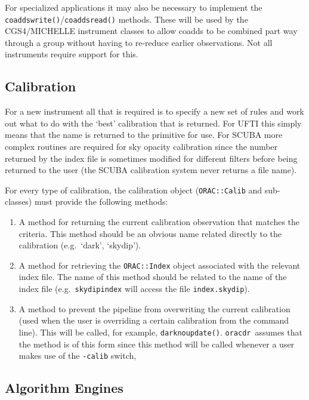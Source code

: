 \documentclass[twoside,11pt]{article}
\renewcommand{\_}{\texttt{\symbol{95}}}
\newcommand{\oracdr}{\texttt{oracdr}}
\begin{document}
For specialized applications it may also be necessary to implement 
the \texttt{coaddswrite()}/\texttt{coaddsread()} methods. These will
be used by the CGS4/MICHELLE instrument classes to allow coadds to be 
combined part way through a group without having to re-reduce earlier
observations. Not all instruments require support for this.

\subsection{Calibration}\label{calibration_add}

For a new instrument all that is required is to specify a new
set of rules and work out what to do with the `best' calibration that
is returned. For UFTI this simply means that the name is returned to
the primitive for use. For SCUBA more complex routines are required
for sky opacity calibration since the number returned by the index
file is sometimes modified for different filters before being returned 
to the user (the SCUBA calibration system never returns a file name).

For every type of calibration, the calibration object
(\texttt{ORAC::Calib} and sub-classes) must provide the following methods:
\begin{enumerate}
\item A method for returning the current calibration observation that
matches the criteria. This method should be an obvious name related
directly to the calibration (e.g.\ `dark', `skydip').
\item A method for retrieving the \texttt{ORAC::Index} object
associated with the relevant index file. The name of this method
should be related to the name of the index file (e.g.\
\texttt{skydipindex} will access the file \texttt{index.skydip}).
\item A method to prevent the pipeline from overwriting the current
calibration (used when the user is overriding a certain calibration
from the command line). This will be called, for example,
\texttt{darknoupdate()}. \oracdr\ assumes that the method
is of this form since this method will be called whenever a user
makes use of the \texttt{-calib} switch,

\end{enumerate}



\subsection{Algorithm Engines}
\end{document}
